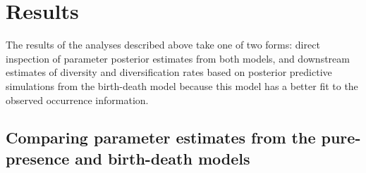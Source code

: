 \documentclass[12pt,letterpaper]{article}
\begin{document}
\section*{Results}

The results of the analyses described above take one of two forms: direct inspection of parameter posterior estimates from both models, and downstream estimates of diversity and diversification rates based on posterior predictive simulations from the birth-death model because this model has a better fit to the observed occurrence information.

\subsection*{Comparing parameter estimates from the pure-presence and birth-death models}

\end{document}

